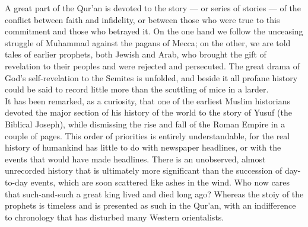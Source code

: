 \documentclass[11pt, b5paper, twoside]{book}
\begin{document}
A great part of the Qur'an is devoted to the story --- or series of stories --- of the conflict between 
faith and infidelity, or between those who were true to this commitment and those who betrayed it. On 
the one hand we follow the unceasing struggle of Muhammad against the pagans of Mecca; on the other, 
we are told tales of earlier prophets, both Jewish and Arab, who brought the gift of revelation to 
their peoples and were rejected and persecuted. The great drama of God's self-revelation to the 
Semites is unfolded, and beside it all profane history could be said to record little more than the 
scuttling of mice in a larder. \\

It has been remarked, as a curiosity, that one of the earliest Muslim historians devoted the major 
section of his history of the world to the story of Yusuf (the Biblical Joseph), while dismissing the 
rise and fall of the Roman Empire in a couple of pages. This order of priorities is entirely 
understandable, for the real history of humankind has little to do with newspaper headlines, or with 
the events that would have made headlines. There is an unobserved, almost unrecorded history that is 
ultimately more significant than the succession of day-to-day events, which are soon scattered like 
ashes in the wind. Who now cares that such-and-such a great king lived and died long ago? Whereas the 
stoiy of the prophets is timeless and is presented as such in the Qur'an, with an indifference to 
chronology that has disturbed many Western orientalists. \\
\end{document}
